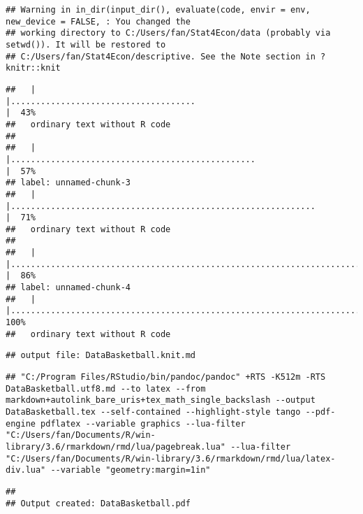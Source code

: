 \documentclass[
]{article}
\begin{document}
\begin{verbatim}
## Warning in in_dir(input_dir(), evaluate(code, envir = env, new_device = FALSE, : You changed the
## working directory to C:/Users/fan/Stat4Econ/data (probably via setwd()). It will be restored to
## C:/Users/fan/Stat4Econ/descriptive. See the Note section in ?knitr::knit
\end{verbatim}

\begin{verbatim}
##   |                                                                                              |.....................................                                                 |  43%
##   ordinary text without R code
## 
##   |                                                                                              |.................................................                                     |  57%
## label: unnamed-chunk-3
##   |                                                                                              |.............................................................                         |  71%
##   ordinary text without R code
## 
##   |                                                                                              |..........................................................................            |  86%
## label: unnamed-chunk-4
##   |                                                                                              |......................................................................................| 100%
##   ordinary text without R code
\end{verbatim}

\begin{verbatim}
## output file: DataBasketball.knit.md
\end{verbatim}

\begin{verbatim}
## "C:/Program Files/RStudio/bin/pandoc/pandoc" +RTS -K512m -RTS DataBasketball.utf8.md --to latex --from markdown+autolink_bare_uris+tex_math_single_backslash --output DataBasketball.tex --self-contained --highlight-style tango --pdf-engine pdflatex --variable graphics --lua-filter "C:/Users/fan/Documents/R/win-library/3.6/rmarkdown/rmd/lua/pagebreak.lua" --lua-filter "C:/Users/fan/Documents/R/win-library/3.6/rmarkdown/rmd/lua/latex-div.lua" --variable "geometry:margin=1in"
\end{verbatim}

\begin{verbatim}
## 
## Output created: DataBasketball.pdf
\end{verbatim}
\end{document}
